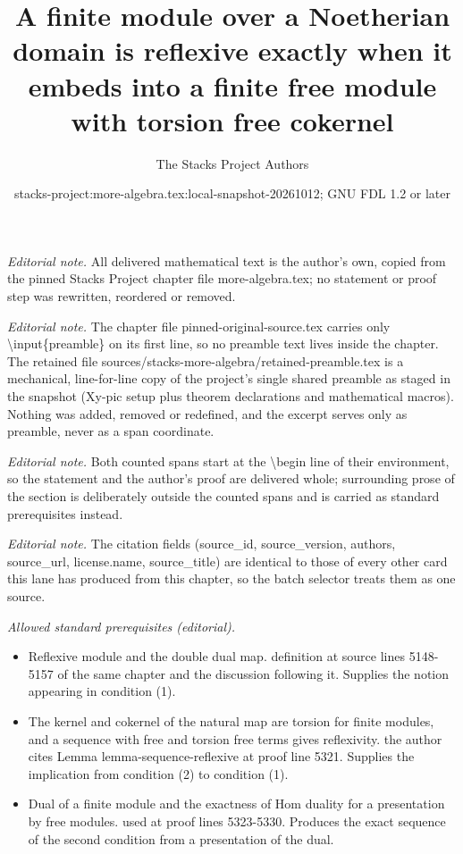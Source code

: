 \documentclass[10pt,a4paper]{amsart}
\title{A finite module over a Noetherian domain is reflexive exactly when it embeds into a finite free module with torsion free cokernel}
\author{The Stacks Project Authors}
\date{stacks-project:more-algebra.tex:local-snapshot-20261012; GNU FDL 1.2 or later}
\theoremstyle{plain}
\theoremstyle{definition}
\theoremstyle{remark}
\numberwithin{equation}{subsection}
\begin{document}
\maketitle
\setcounter{subsection}{1}
\noindent\textit{Editorial note.} All delivered mathematical text is the author's own, copied from the pinned Stacks Project chapter file more-algebra.tex; no statement or proof step was rewritten, reordered or removed.\par\medskip
\noindent\textit{Editorial note.} The chapter file pinned-original-source.tex carries only \textbackslash{}input\{preamble\} on its first line, so no preamble text lives inside the chapter. The retained file sources/stacks-more-algebra/retained-preamble.tex is a mechanical, line-for-line copy of the project's single shared preamble as staged in the snapshot (Xy-pic setup plus theorem declarations and mathematical macros). Nothing was added, removed or redefined, and the excerpt serves only as preamble, never as a span coordinate.\par\medskip
\noindent\textit{Editorial note.} Both counted spans start at the \textbackslash{}begin line of their environment, so the statement and the author's proof are delivered whole; surrounding prose of the section is deliberately outside the counted spans and is carried as standard prerequisites instead.\par\medskip
\noindent\textit{Editorial note.} The citation fields (source\_id, source\_version, authors, source\_url, license.name, source\_title) are identical to those of every other card this lane has produced from this chapter, so the batch selector treats them as one source.\par\medskip
\noindent\textit{Allowed standard prerequisites (editorial).}\begin{itemize}
\item Reflexive module and the double dual map. definition at source lines 5148-5157 of the same chapter and the discussion following it. Supplies the notion appearing in condition (1).
\item The kernel and cokernel of the natural map are torsion for finite modules, and a sequence with free and torsion free terms gives reflexivity. the author cites Lemma lemma-sequence-reflexive at proof line 5321. Supplies the implication from condition (2) to condition (1).
\item Dual of a finite module and the exactness of Hom duality for a presentation by free modules. used at proof lines 5323-5330. Produces the exact sequence of the second condition from a presentation of the dual.
\end{itemize}\medskip
\end{document}
